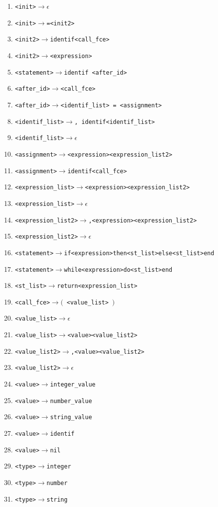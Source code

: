 \documentclass[11pt]{article}
\newcommand{\term}[1]{{\color{red}#1}}
\newcommand{\arrow}{$\rightarrow$}
\begin{document}
\begin{enumerate}
    \item \texttt{<init>\arrow{}$\epsilon$}
    \item \texttt{<init>\arrow{}\term{=}<init2>}
    \item \texttt{<init2>\arrow{}\term{identif}<call\_fce>}
    \item \texttt{<init2>\arrow{}<expression>}
    \item \texttt{<statement>\arrow \term{identif} <after\_id>}    %
    \item \texttt{<after\_id>\arrow{}<call\_fce>}
    \item \texttt{<after\_id>\arrow{}<identif\_list> \term{=} <assignment>}  
    \item \texttt{<identif\_list>\arrow{}\term{,} \term{identif}<identif\_list>}
    \item \texttt{<identif\_list>\arrow{}$\epsilon$}
    \item \texttt{<assignment>\arrow{}<expression><expression\_list2>}
    \item \texttt{<assignment>\arrow{}\term{identif}<call\_fce>} 
    \item \texttt{<expression\_list>\arrow{}<expression><expression\_list2>}
    \item \texttt{<expression\_list>\arrow{}$\epsilon$}
    \item \texttt{<expression\_list2>\arrow{}\term{,}<expression><expression\_list2>}
    \item \texttt{<expression\_list2>\arrow{}$\epsilon$}
    \item \texttt{<statement>\arrow{}\term{if}<expression>\term{then}<st\_list>\term{else}<st\_list>\term{end}}
    \item \texttt{<statement>\arrow{}\term{while}<expression>\term{do}<st\_list>\term{end}}     
    \item \texttt{<st\_list>\arrow{}\term{return}<expression\_list>}
    \item \texttt{<call\_fce>\arrow{}\term{$($} <value\_list> \term{$)$}}
    \item \texttt{<value\_list>\arrow{}$\epsilon$}
    \item \texttt{<value\_list>\arrow{}<value><value\_list2>}
    \item \texttt{<value\_list2>\arrow{}\term{,}<value><value\_list2>}
    \item \texttt{<value\_list2>\arrow{}$\epsilon$}
    \item \texttt{<value>\arrow{\term{integer\_value}}}
    \item \texttt{<value>\arrow{\term{number\_value}}}
    \item \texttt{<value>\arrow{\term{string\_value}}}
    \item \texttt{<value>\arrow{\term{identif}}}
    \item \texttt{<value>\arrow{\term{nil}}}
    \item \texttt{<type>\arrow{}\term{integer}}
    \item \texttt{<type>\arrow{}\term{number}}
    \item \texttt{<type>\arrow{}\term{string}}
\end{enumerate}
\end{document}
